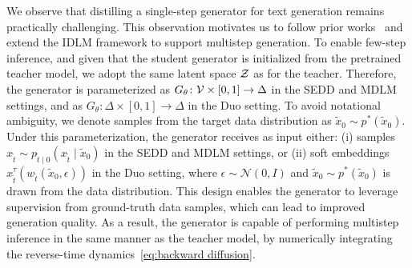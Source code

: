     We observe that distilling a single-step generator for text generation remains practically challenging. This observation motivates us to follow prior works~\citep{yin2024one, yin2024improved, gushchin2025inverse} and extend the IDLM framework to support multistep generation. To enable few-step inference, and given that the student generator is initialized from the pretrained teacher model, we adopt the same latent space $\mathcal{Z}$ as for the teacher. Therefore, the generator is parameterized as $G_{\theta} \colon \mathcal{V} \times [0, 1] \to \Delta$ in the SEDD and MDLM settings, and as $G_{\theta} \colon \Delta \times [0, 1] \to \Delta$ in the Duo setting. To avoid notational ambiguity, we denote samples from the target data distribution as $\tilde{x}_0 \sim p^*(\tilde{x}_0)$. Under this parameterization, the generator receives as input either: (i) samples $x_{\tilde{t}} \sim p_{\tilde{t} \mid 0}(x_{\tilde{t}} \mid \tilde{x}_0)$ in the SEDD and MDLM settings, or (ii) soft embeddings $x_{\tilde{t}}^{\tau}(w_{\tilde{t}}(\tilde{x}_0, \epsilon))$ in the Duo setting, where $\epsilon \sim \mathcal{N}(0, I)$ and $\tilde{x}_0 \sim p^*(\tilde{x}_0)$ is drawn from the data distribution.
    This design enables the generator to leverage supervision from ground-truth data samples, which can lead to improved generation quality. As a result, the generator is capable of performing multistep inference in the same manner as the teacher model, by numerically integrating the reverse-time dynamics~\eqref{eq:backward diffusion}.
    

